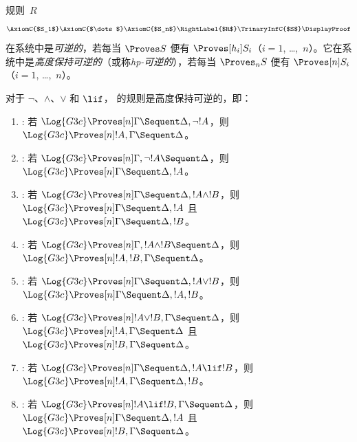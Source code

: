 \documentclass[../../../include/open-logic-section]{subfiles}
\begin{document}


\begin{defn}
规则~$R$\[
\AxiomC{$S_1$}
\AxiomC{$\dots$}
\AxiomC{$S_n$}
\RightLabel{$R$}
\TrinaryInfC{$S$}
\DisplayProof
\]在系统中是\emph{可逆的}，若每当 $\Proves S$ 便有 $\Proves[h_i] S_i$（$i = 1$, \dots,~$n$）。它在系统中是\emph{高度保持可逆的}（或称\emph{hp-可逆的}），若每当 $\Proves_n S$ 便有 $\Proves[n] S_i$（$i = 1$, \dots,~$n$）。
\end{defn}

\begin{lem}
对于 $\lnot$、$\land$、$\lor$ 和 $\lif$， 的规则是高度保持可逆的，即：
\begin{enumerate}
  \item \RightR{\lnot}: 若 $\Log{G3c} \Proves[n] \Gamma \Sequent
  \Delta, \lnot !A$，则 $\Log{G3c} \Proves[n] !A, \Gamma \Sequent
  \Delta$。
  \item \LeftR{\lnot}: 若 $\Log{G3c} \Proves[n] \Gamma, \lnot !A
  \Sequent \Delta$，则 $\Log{G3c} \Proves[n] \Gamma \Sequent \Delta,
  !A$。
  \item \RightR{\land}: 若 $\Log{G3c} \Proves[n] \Gamma \Sequent
  \Delta, !A \land !B$，则 $\Log{G3c} \Proves[n] \Gamma \Sequent
  \Delta, !A$ 且 $\Log{G3c} \Proves[n] \Gamma \Sequent
  \Delta, !B$。
  \item \LeftR{\land}: 若 $\Log{G3c} \Proves[n] \Gamma, !A \land !B
  \Sequent \Delta$，则 $\Log{G3c} \Proves[n] !A, !B, \Gamma \Sequent
  \Delta$。
  \item \RightR{\lor}: 若 $\Log{G3c} \Proves[n] \Gamma \Sequent
  \Delta, !A \lor !B$，则 $\Log{G3c} \Proves[n] \Gamma \Sequent
  \Delta, !A, !B$。
  \item \LeftR{\lor}: 若 $\Log{G3c} \Proves[n] !A \lor !B, \Gamma \Sequent
  \Delta$，则 $\Log{G3c} \Proves[n] !A, \Gamma \Sequent
  \Delta$ 且 $\Log{G3c} \Proves[n] !B, \Gamma \Sequent
  \Delta$。
  \item \RightR{\lif}: 若 $\Log{G3c} \Proves[n] \Gamma \Sequent
  \Delta, !A \lif !B$，则 $\Log{G3c} \Proves[n] !A, \Gamma \Sequent
  \Delta, !B$。
  \item \LeftR{\lif}: 若 $\Log{G3c} \Proves[n] !A \lif !B, \Gamma
  \Sequent \Delta$，则 $\Log{G3c} \Proves[n] \Gamma \Sequent \Delta,
  !A$ 且 $\Log{G3c} \Proves[n] !B, \Gamma \Sequent \Delta$。
\end{enumerate}
\end{lem}
\end{document}
